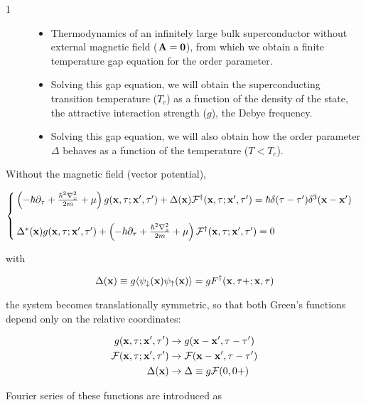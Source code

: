 \begin{description}
\item[1] \hfill
\begin{itemize}
\item Thermodynamics of an infinitely large bulk superconductor without external magnetic field ($\bf A=0$), from which we obtain a finite temperature gap equation for the order parameter. 
\item Solving this gap equation, we will obtain the superconducting transition temperature ($T_c$) as a function of the density of the state, the attractive interaction strength ($g$), the Debye frequency. 
\item Solving this gap equation, we will also obtain how the order parameter $\Delta$ behaves as a function of the temperature ($T<T_c$). 
\end{itemize}
\end{description}

Without the magnetic field (vector potential), 

\[
\begin{cases}
\left(-\hbar\partial_\tau + \frac{\hbar^2\nabla_x^2}{2m}+\mu\right)g({\bf x},\tau;{\bf x'},\tau')+\Delta({\bf x})\mathcal{F}^\dagger({\bf x},\tau;{\bf x'},\tau') = \hbar\delta(\tau-\tau')\delta^3({\bf x}-{\bf x}')\\
\ \\
\Delta^*({\bf x})g({\bf x},\tau;{\bf x'},\tau') + \left(-\hbar\partial_\tau + \frac{\hbar^2\nabla_x^2}{2m}+\mu\right)\mathcal{F}^\dagger({\bf x},\tau;{\bf x'},\tau')  = 0
\end{cases}
\]

with

\[\Delta({\bf x}) \equiv g\langle\psi_\downarrow({\bf x})\psi_\uparrow({\bf x})\rangle = g{F}^\dagger({\bf x},\tau+;{\bf x},\tau) \]

the system becomes translationally symmetric, so that both Green's functions depend only on the relative coordinates:

\[\begin{split}
g({\bf x},\tau;{\bf x'},\tau')&\rightarrow g({\bf x-x'},\tau-\tau')\\
\mathcal{F}({\bf x},\tau;{\bf x'},\tau')&\rightarrow\mathcal{F}({\bf x-x'},\tau-\tau')\\
\Delta({\bf x})&\rightarrow\Delta\equiv g\mathcal{F}(0,0+)
\end{split} \]

Fourier series of these functions are introduced as

